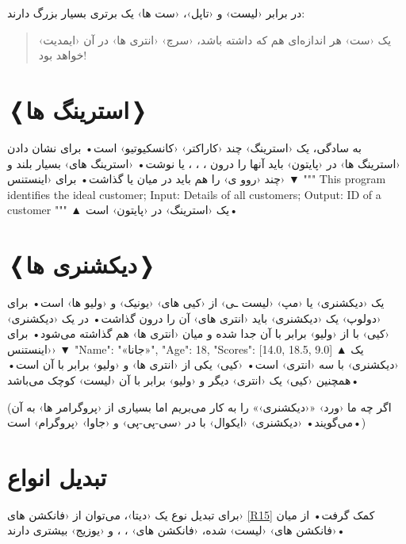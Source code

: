 \documentclass[openany, twocolumn]{book}
\begin{document}
در برابر ‹لیست› و ‹تاپل›، ‹ست ها› یک برتری بسیار بزرگ دارند:
\begin{quotation}
یک ‹ست› هر اندازه‌ای هم که داشته باشد، ‹سرچ› ‹انتری ها› در آن ‹ایمدیت› خواهد بود!
\end{quotation}

\section{❬استرینگ ها❭}
به سادگی، یک ‹استرینگ› چند ‹کاراکتر› ‹کانسکیوتیو› است• برای نشان دادن ‹استرینگ ها› در ‹پایتون› باید آنها را درون ، ، ، یا  نوشت• ‹استرینگ های› بسیار بلند و چند ‹روو ی› را هم باید در میان  یا  گذاشت• برای ‹اینستنس› 
▼
"""
This program identifies the ideal customer;
	Input: Details of all customers;
	Output: ID of a customer
"""
▲
 یک ‹استرینگ› در ‹پایتون› است•

\section{❬دیکشنری ها❭}
یک ‹دیکشنری› یا ‹مپ› ‹لیست ـی› از ‹کیی های› ‹یونیک› و ‹ولیو ها› است• برای ‹دولوپ› یک ‹دیکشنری› باید ‹انتری های› آن را درون \code{\{\}} گذاشت• در یک ‹دیکشنری› ‹کیی› با \code{:} از ‹ولیو› برابر با آن جدا شده و میان ‹انتری ها› هم \code{,} گذاشته می‌شود• برای ‹اینستنس› 
▼
{
	"Name": "«جانا»",
	"Age": 18,
	"Scores": [14.0, 18.5, 9.0]
}
▲
 یک ‹دیکشنری› با سه ‹انتری› است• ‹کیی› یکی از ‹انتری ها›  و ‹ولیو› برابر با آن  است• همچنین ‹کیی› یک ‹انتری› دیگر  و ‹ولیو› برابر با آن ‹لیست› کوچک \code{[14.0, 18.5, 9.0]} می‌باشد•

(اگر چه ما ‹ورد› «‹دیکشنری›» را به کار می‌بریم اما بسیاری از ‹پروگرامر ها› به آن  می‌گویند• ‹دیکشنری› ‹ایکوال› با  در ‹سی-پی-پی› و ‹جاوا› ‹پروگرام› است•)

\section{تبدیل انواع\label{R14}}
برای تبدیل نوع یک ‹دیتا›، می‌توان از ‹فانکشن های› \ref{R15} کمک گرفت• از میان ‹فانکشن های› ‹لیست› شده، ‹فانکشن های› ، ،  و ‹یوزیج› بیشتری دارند•
\end{document}
